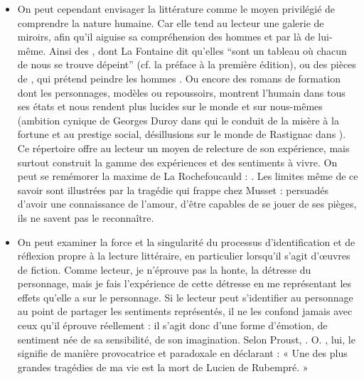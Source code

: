 {\begin{itemize}
\item On peut cependant envisager la littérature comme le moyen privilégié de comprendre
la nature humaine. Car elle tend au lecteur une galerie de miroirs, afin qu’il aiguise sa
compréhension des hommes et par là de lui-même. Ainsi des , dont La Fontaine
dit qu’elles “sont un tableau où chacun de nous se trouve dépeint” (cf. la préface à la
première édition), ou des pièces de , qui prétend peindre les hommes . Ou encore des romans de formation dont les personnages, modèles ou
repoussoirs, montrent l’humain dans tous ses états et nous rendent plus lucides sur le
monde et sur nous-mêmes (ambition cynique de Georges Duroy dans  qui le
conduit de la misère à la fortune et au prestige social, désillusions sur le monde de
Rastignac dans ). Ce répertoire offre au lecteur un moyen de relecture
de son expérience, mais surtout construit la gamme des expériences et des sentiments
à vivre. On peut se remémorer la maxime de La Rochefoucauld : . Les
limites même de ce savoir sont illustrées par la tragédie qui frappe 
chez Musset : persuadés d’avoir une connaissance de l’amour, d’être capables de se
jouer de ses pièges, ils ne savent pas le reconnaître.

\item On peut examiner la force et la singularité du processus d’identification et de réflexion
propre à la lecture littéraire, en particulier lorsqu’il s’agit d’œuvres de fiction. Comme
lecteur, je n’éprouve pas la honte, la détresse du personnage, mais je fais l’expérience
de cette détresse en me représentant les effets qu’elle a sur le personnage. Si le
lecteur peut s’identifier au personnage au point de partager les sentiments
représentés, il ne les confond jamais avec ceux qu’il éprouve réellement : il s’agit donc
d’une forme d’émotion, de sentiment née de sa sensibilité, de son imagination. Selon
Proust, . O. , lui, le signifie de manière provocatrice et paradoxale en déclarant : « Une des
plus grandes tragédies de ma vie est la mort de Lucien de Rubempré. »


\end{itemize}}
